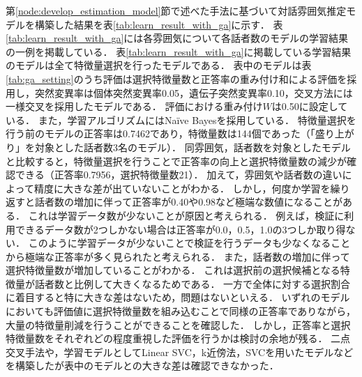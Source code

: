第\ref{node:develop_estimation_model}節で述べた手法に基づいて対話雰囲気推定モデルを構築した結果を表\ref{tab:learn_result_with_ga}に示す．
表\ref{tab:learn_result_with_ga}には各雰囲気について各話者数のモデルの学習結果の一例を掲載している．
表\ref{tab:learn_result_with_ga}に掲載している学習結果のモデルは全て特徴量選択を行ったモデルである．
表中のモデルは表\ref{tab:ga_setting}のうち評価は選択特徴量数と正答率の重み付け和による評価を採用し，突然変異率は個体突然変異率0.05，遺伝子突然変異率0.10，交叉方法には一様交叉を採用したモデルである．
評価における重み付け$W$は0.50に設定している．
また，学習アルゴリズムにはNaïve Bayesを採用している．
特徴量選択を行う前のモデルの正答率は0.7462であり，特徴量数は144個であった（「盛り上がり」を対象とした話者数3名のモデル）．
同雰囲気，話者数を対象としたモデルと比較すると，特徴量選択を行うことで正答率の向上と選択特徴量数の減少が確認できる（正答率0.7956，選択特徴量数21）．
加えて，雰囲気や話者数の違いによって精度に大きな差が出ていないことがわかる．
しかし，何度か学習を繰り返すと話者数の増加に伴って正答率が0.40や0.98など極端な数値になることがある．
これは学習データ数が少ないことが原因と考えられる．
例えば，検証に利用できるデータ数が2つしかない場合は正答率が0.0，0.5，1.0の3つしか取り得ない．
このように学習データが少ないことで検証を行うデータも少なくなることから極端な正答率が多く見られたと考えられる．
また，話者数の増加に伴って選択特徴量数が増加していることがわかる．
これは選択前の選択候補となる特徴量が話者数と比例して大きくなるためである．
一方で全体に対する選択割合に着目すると特に大きな差はないため，問題はないといえる．
いずれのモデルにおいても評価値に選択特徴量数を組み込むことで同様の正答率でありながら，大量の特徴量削減を行うことができることを確認した．
しかし，正答率と選択特徴量数をそれぞれどの程度重視した評価を行うかは検討の余地が残る．
二点交叉手法や，学習モデルとしてLinear SVC，k近傍法，SVCを用いたモデルなどを構築したが表中のモデルとの大きな差は確認できなかった．

